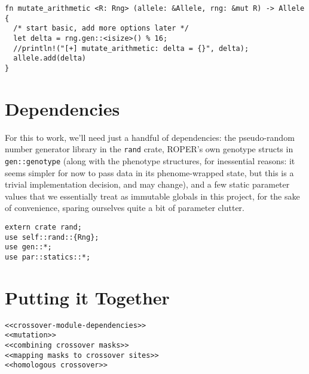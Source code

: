 \documentclass[11pt]{article}
\begin{document}
\lstset{language=rust,label=org189468c,caption= ,captionpos=b,numbers=none}
\begin{lstlisting}
fn mutate_arithmetic <R: Rng> (allele: &Allele, rng: &mut R) -> Allele {
  /* start basic, add more options later */
  let delta = rng.gen::<isize>() % 16;
  //println!("[+] mutate_arithmetic: delta = {}", delta);
  allele.add(delta)
}
\end{lstlisting}

\section{Dependencies}
\label{sec:org1f9ef41}

For this to work, we'll need just a handful of dependencies: the pseudo-random
number generator library in the \texttt{rand} crate, ROPER's own genotype structs in
\texttt{gen::genotype} (along with the phenotype structures, for inessential reasons:
it seems simpler for now to pass data in its phenome-wrapped state, but this is
a trivial implementation decision, and may change), and a few static parameter
values that we essentially treat as immutable globals in this project, for
the sake of convenience, sparing ourselves quite a bit of parameter clutter.

\lstset{language=rust,label=org5a7a31d,caption= ,captionpos=b,numbers=none}
\begin{lstlisting}
extern crate rand;
use self::rand::{Rng};
use gen::*;
use par::statics::*;
\end{lstlisting}


\section{Putting it Together}
\label{sec:org1d62233}
\lstset{language=rust,label=orgb805b9d,caption= ,captionpos=b,numbers=none}
\begin{lstlisting}
<<crossover-module-dependencies>>
<<mutation>>
<<combining crossover masks>>
<<mapping masks to crossover sites>>
<<homologous crossover>>
\end{lstlisting}
\end{document}
